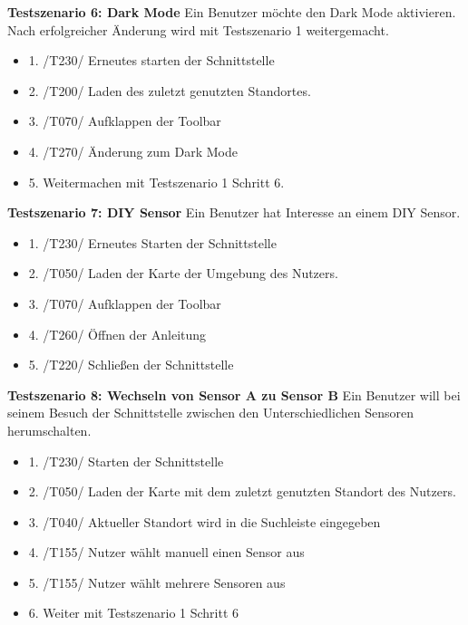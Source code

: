 \textbf{Testszenario 6: Dark Mode}
\newline
Ein Benutzer möchte den Dark Mode aktivieren. Nach erfolgreicher Änderung wird mit Testszenario 1 weitergemacht.
\begin{itemize} [noitemsep]
    \item 1. /T230/ Erneutes starten der Schnittstelle
    \item 2. /T200/ Laden des zuletzt genutzten Standortes.
    \item 3. /T070/ Aufklappen der Toolbar
    \item 4. /T270/ Änderung zum Dark Mode
    \item 5. Weitermachen mit Testszenario 1 Schritt 6.
\end{itemize}

\textbf{Testszenario 7: DIY Sensor}
\newline
Ein Benutzer hat Interesse an einem DIY Sensor.
\begin{itemize} [noitemsep]
    \item 1. /T230/ Erneutes Starten der Schnittstelle
    \item 2. /T050/ Laden der Karte der Umgebung des Nutzers.
    \item 3. /T070/ Aufklappen der Toolbar
    \item 4. /T260/ Öffnen der Anleitung
    \item 5. /T220/ Schließen der Schnittstelle
\end{itemize}

\textbf{Testszenario 8: Wechseln von Sensor A zu Sensor B}
\newline
Ein Benutzer will bei seinem Besuch der Schnittstelle zwischen den Unterschiedlichen Sensoren herumschalten. 
\begin{itemize} [noitemsep]
    \item 1. /T230/ Starten der Schnittstelle
    \item 2. /T050/ Laden der Karte mit dem zuletzt genutzten Standort des Nutzers.
    \item 3. /T040/ Aktueller Standort wird in die Suchleiste eingegeben
    \item 4. /T155/ Nutzer wählt manuell einen Sensor aus 
    \item 5. /T155/ Nutzer wählt mehrere Sensoren aus
    \item 6. Weiter mit Testszenario 1 Schritt 6
\end{itemize}

